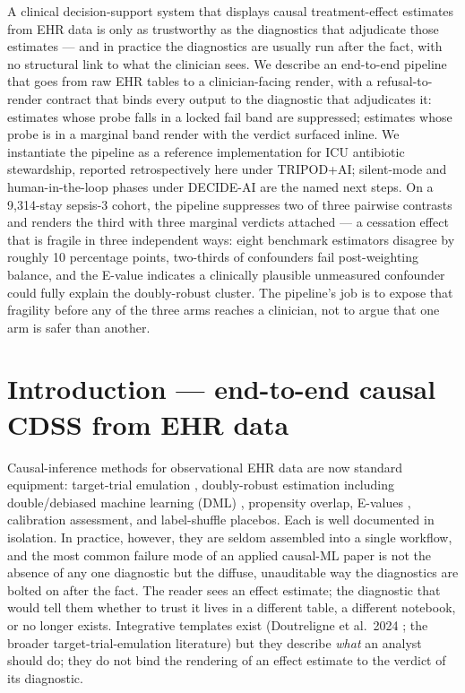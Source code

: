 \documentclass[11pt,a4paper]{article}
\begin{document}
A clinical decision-support system that displays causal treatment-effect estimates from EHR data is only as trustworthy as the diagnostics that adjudicate those estimates --- and in practice the diagnostics are usually run after the fact, with no structural link to what the clinician sees. We describe an end-to-end pipeline that goes from raw EHR tables to a clinician-facing render, with a refusal-to-render contract that binds every output to the diagnostic that adjudicates it: estimates whose probe falls in a locked fail band are suppressed; estimates whose probe is in a marginal band render with the verdict surfaced inline. We instantiate the pipeline as a reference implementation for ICU antibiotic stewardship, reported retrospectively here under TRIPOD+AI; silent-mode and human-in-the-loop phases under DECIDE-AI are the named next steps. On a 9{,}314-stay sepsis-3 cohort, the pipeline suppresses two of three pairwise contrasts and renders the third with three marginal verdicts attached --- a cessation effect that is fragile in three independent ways: eight benchmark estimators disagree by roughly 10 percentage points, two-thirds of confounders fail post-weighting balance, and the E-value indicates a clinically plausible unmeasured confounder could fully explain the doubly-robust cluster. The pipeline's job is to expose that fragility before any of the three arms reaches a clinician, not to argue that one arm is safer than another.

\section{Introduction --- end-to-end causal CDSS from EHR data}

Causal-inference methods for observational EHR data are now standard equipment: target-trial emulation \cite{hernan2016target}, doubly-robust estimation including double/debiased machine learning (DML) \cite{chernozhukov2018dml}, propensity overlap, E-values \cite{vanderweele2017evalue}, calibration assessment, and label-shuffle placebos. Each is well documented in isolation. In practice, however, they are seldom assembled into a single workflow, and the most common failure mode of an applied causal-ML paper is not the absence of any one diagnostic but the diffuse, unauditable way the diagnostics are bolted on after the fact. The reader sees an effect estimate; the diagnostic that would tell them whether to trust it lives in a different table, a different notebook, or no longer exists. Integrative templates exist (Doutreligne et al.\ 2024 \cite{doutreligne2024stepbystep}; the broader target-trial-emulation literature) but they describe \emph{what} an analyst should do; they do not bind the rendering of an effect estimate to the verdict of its diagnostic.
\end{document}
